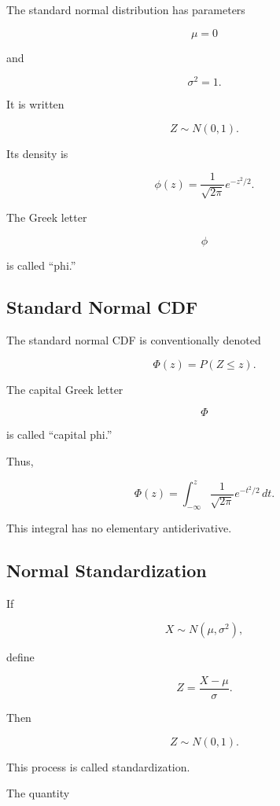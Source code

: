 The standard normal distribution has parameters

\[
\mu=0
\]

and

\[
\sigma^2=1.
\]

It is written

\[
\boxed{
Z\sim N(0,1).
}
\]

Its density is

\[
\boxed{
\phi(z)
=
\frac{1}{\sqrt{2\pi}}
e^{-z^2/2}.
}
\]

The Greek letter

\[
\phi
\]

is called ``phi.''

\subsection{Standard Normal CDF}
\label{subsec:standard-normal-cdf}

The standard normal CDF is conventionally denoted

\[
\boxed{
\Phi(z)
=
P(Z\leq z).
}
\]

The capital Greek letter

\[
\Phi
\]

is called ``capital phi.''

Thus,

\[
\boxed{
\Phi(z)
=
\int_{-\infty}^{z}
\frac{1}{\sqrt{2\pi}}
e^{-t^2/2}\,dt.
}
\]

This integral has no elementary antiderivative.

\subsection{Normal Standardization}
\label{subsec:normal-standardization}

If

\[
X\sim N(\mu,\sigma^2),
\]

define

\[
\boxed{
Z
=
\frac{X-\mu}{\sigma}.
}
\]

Then

\[
\boxed{
Z\sim N(0,1).
}
\]

This process is called standardization.

The quantity

